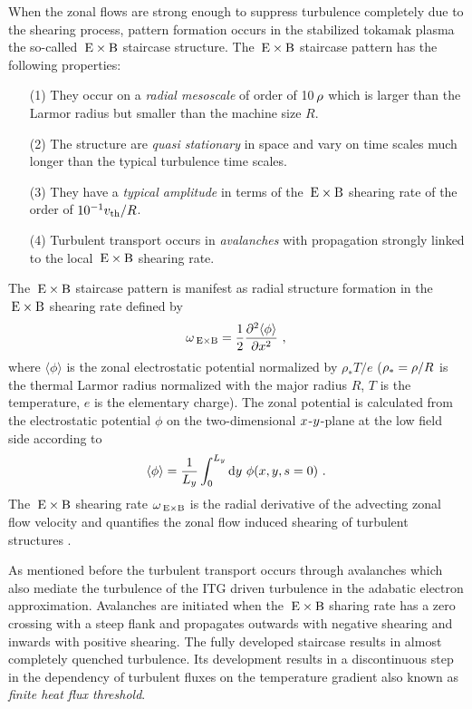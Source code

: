 When the zonal flows are strong enough to suppress turbulence completely due to the shearing process, pattern formation occurs in the stabilized tokamak plasma the so-called $\mathrm{\:E}\times\mathrm{B}$ staircase structure. The $\mathrm{\:E}\times\mathrm{B}$ staircase pattern has the following properties:
\begin{enumerate}
	\item[(1)] They occur on a \textit{radial mesoscale} of order of 10\,$\rho$ which is larger than the Larmor radius but smaller than the machine size $R$.
	\item[(2)] The structure are \textit{quasi stationary} in space and vary on time scales much longer than the typical turbulence time scales.
	\item[(3)] They have a \textit{typical amplitude} in terms of the $\mathrm{\:E}\times\mathrm{B}$ shearing rate of the order of $10^{-1} v_{\mathrm{th}}/R$.
	\item[(4)] Turbulent transport occurs in \textit{avalanches} with propagation strongly linked to the local $\mathrm{\:E}\times\mathrm{B}$ shearing rate. \cite{McMillan2009}
\end{enumerate} \bigskip

The $\mathrm{\:E}\times\mathrm{B}$ staircase pattern is manifest as radial structure formation in the $\mathrm{\:E}\times\mathrm{B}$ shearing rate defined by\cite{Rath2016, Pueschel2008, Peeters2016}
\begin{equation}
	\omega_{\mathrm{\:E \times B}} = \frac{1}{2} \frac{\partial^2 \langle \phi \rangle}{\partial x^2}~,
	\label{eq:shearingrate}
\end{equation}
where $\langle \phi \rangle$ is the zonal electrostatic potential normalized by $\rho_\ast T/e$ ($\rho_\ast = \rho/R$ is the thermal Larmor radius normalized with the major radius $R$, $T$ is the temperature, $e$ is the elementary charge).
The zonal potential is calculated from the electrostatic potential $\phi$ on the two-dimensional $x$-$y$-plane at the low field side according to\cite{Rath2021}
\begin{equation}
\langle \phi \rangle = \frac{1}{L_y} \int_0^{L_y} \mathrm{d}y ~ \phi(x,y,s=0)~.
\end{equation}
The $\mathrm{\:E}\times\mathrm{B}$ shearing rate $\omega_{\mathrm{\:E \times B}}$ is the radial derivative of the advecting zonal flow velocity \cite{Hahm1995, Waltz1998} and quantifies the zonal flow induced shearing of turbulent structures \cite{Biglari1990, Hahm1995, Burnell1997}. \\ \bigskip

As mentioned before the turbulent transport occurs through avalanches which also mediate the turbulence of the ITG driven turbulence in the adabatic electron approximation. Avalanches are initiated when the $\mathrm{\:E}\times\mathrm{B}$ sharing rate has a zero crossing with a steep flank and propagates outwards with negative shearing and inwards with positive shearing. \cite{Idomura2009,McMillan2009} The fully developed staircase results in almost completely quenched turbulence. Its development results in a discontinuous step in the dependency of turbulent fluxes on the temperature gradient also known as \textit{finite heat flux threshold}. \cite{Peeters2016,Weikl2017}